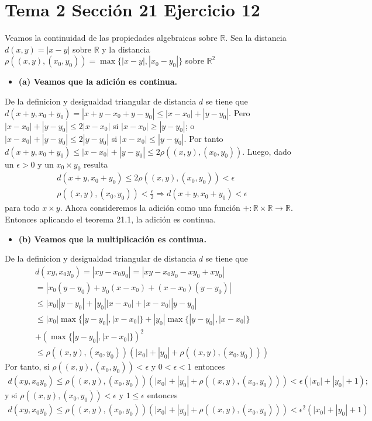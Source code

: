 \documentclass{article}
\begin{document}
\section{Tema 2 Sección 21 Ejercicio 12}
Veamos la continuidad de las propiedades algebraicas sobre $\mathbb{R}$. Sea la distancia $d(x,y)=|x-y|$ sobre $\mathbb{R}$ y la distancia $\rho((x,y),(x_0,y_0))=\max\{|x-y|,|x_0-y_0|\}$ sobre $\mathbb{R}^2$
\begin{itemize}
\item \bf (a) \rm Veamos que la adición es continua.
\end{itemize}
De la definicion y desigualdad triangular de distancia $d$ se tiene que $d(x+y,x_0+ y_0)=|x+y-x_0+y-y_0|\leq |x-x_0|+|y-y_0|$. Pero $|x-x_0|+|y-y_0|\leq 2 |x-x_0|$ si $|x-x_0|\geq |y-y_0|$; o $|x-x_0|+|y-y_0|\leq 2 |y-y_0|$ si $|x-x_0|\leq |y-y_0|$. Por tanto $d(x+y,x_0+ y_0)\leq |x-x_0|+|y-y_0|\leq 2\rho((x,y),(x_0,y_0))$. Luego, dado un $\epsilon>0$ y un $x_0\times y_0$ resulta
\begin{eqnarray}
d(x+y,x_0+ y_0)\leq 2\rho((x,y),(x_0,y_0))<\epsilon\nonumber\\
\rho((x,y),(x_0,y_0))<\frac{\epsilon}{2}\Rightarrow d(x+y,x_0+ y_0)<\epsilon\nonumber
\end{eqnarray}
para todo $x\times y$.
Ahora consideremos la adición como una función $+:\mathbb{R}\times \mathbb{R}\rightarrow \mathbb{R}$. Entonces aplicando el teorema 21.1, la adición es continua.
\begin{itemize}
\item \bf (b) \rm Veamos que la multiplicación es continua.
\end{itemize}
De la definicion y desigualdad triangular de distancia $d$ se tiene que
\begin{eqnarray}
 d(xy,x_0y_0)=|xy-x_0y_0|\nonumber
=|xy-x_0y_0-xy_0+xy_0|\nonumber\\
=|x_0(y-y_0)+y_0(x-x_0)+(x-x_0)(y-y_0)|\nonumber\\
\leq |x_0||y-y_0|+|y_0||x-x_0|+|x-x_0||y-y_0|\nonumber\\
\leq |x_0|\max\{|y-y_0|,|x-x_0|\}+|y_0|\max\{|y-y_0|,|x-x_0|\}\nonumber\\
+(\max\{|y-y_0|,|x-x_0|\})^2\nonumber\\
\leq \rho((x,y),(x_0,y_0))\left(|x_0|+|y_0|+\rho((x,y),(x_0,y_0))\right)\nonumber
\end{eqnarray}
Por tanto, si $\rho((x,y),(x_0,y_0))<\epsilon$ y $0< \epsilon<1$ entonces
\begin{eqnarray}
d(xy,x_0y_0)\leq \rho((x,y),(x_0,y_0))\left(|x_0|+|y_0|+\rho((x,y),(x_0,y_0))\right)<\epsilon\left(|x_0|+|y_0|+1\right);\nonumber
\end{eqnarray}
y si $\rho((x,y),(x_0,y_0))<\epsilon$ y $1\leq \epsilon$ entonces
\begin{eqnarray}
d(xy,x_0y_0)\leq \rho((x,y),(x_0,y_0))\left(|x_0|+|y_0|+\rho((x,y),(x_0,y_0))\right)<\epsilon^2\left(|x_0|+|y_0|+1\right)\nonumber
\end{eqnarray}
\end{document}
